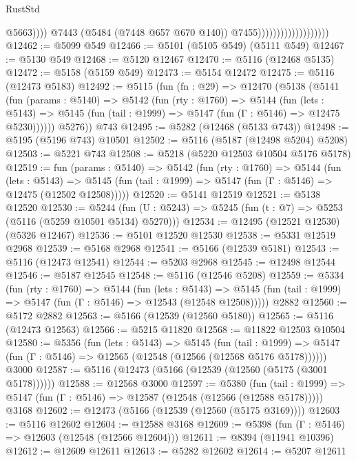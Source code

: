 \begin{lexlean}{RustStd}
\begin{coremodule}
{\begin{coremodule}
{{{{{{{{{{{{{{{{{{{{{{{{{{{{{{{                                                  @5663))))
                                          @7443
                                          (@5484 (@7448 @657 @670 @140))
                                          @7455)))))))))))))))))))
@12462 := @5099 @549
@12466 := @5101 (@5105 @549) (@5111 @549)
@12467 := @5130 @549
@12468 := @5120 @12467
@12470 := @5116 (@12468 @5135)
@12472 := @5158 (@5159 @549)
@12473 := @5154 @12472
@12475 := @5116 (@12473 @5183)
@12492 := @5115
    (fun (fn : @29) =>
    @12470
      (@5138
        (@5141
          (fun (params : @5140) =>
          @5142
            (fun (rty : @1760) =>
            @5144
              (fun (lets : @5143) =>
              @5145 (fun (tail : @1999) => @5147 (fun (Γ : @5146) => @12475 @5230))))))
        @5276))
    @743
@12495 := @5282 (@12468 (@5133 @743))
@12498 := @5195 (@5196 @743) @10501
@12502 := @5116 (@5187 (@12498 @5204) @5208)
@12503 := @5221 @743
@12508 := @5218 (@5220 @12503 @10504 @5176 @5178)
@12519 := fun (params : @5140) =>
  @5142
    (fun (rty : @1760) =>
    @5144
      (fun (lets : @5143) =>
      @5145 (fun (tail : @1999) => @5147 (fun (Γ : @5146) => @12475 (@12502 @12508)))))
@12520 := @5141 @12519
@12521 := @5138 @12520
@12530 := @5244
    (fun (U : @5243) => @5245 (fun (t : @7) => @5253 (@5116 (@5259 @10501 @5134) @5270)))
@12534 := @12495 (@12521 @12530) (@5326 @12467)
@12536 := @5101 @12520 @12530
@12538 := @5331 @12519 @2968
@12539 := @5168 @2968
@12541 := @5166 (@12539 @5181)
@12543 := @5116 (@12473 @12541)
@12544 := @5203 @2968
@12545 := @12498 @12544
@12546 := @5187 @12545
@12548 := @5116 (@12546 @5208)
@12559 := @5334
    (fun (rty : @1760) =>
    @5144
      (fun (lets : @5143) =>
      @5145 (fun (tail : @1999) => @5147 (fun (Γ : @5146) => @12543 (@12548 @12508)))))
    @2882
@12560 := @5172 @2882
@12563 := @5166 (@12539 (@12560 @5180))
@12565 := @5116 (@12473 @12563)
@12566 := @5215 @11820
@12568 := @11822 @12503 @10504
@12580 := @5356
    (fun (lets : @5143) =>
    @5145
      (fun (tail : @1999) =>
      @5147 (fun (Γ : @5146) => @12565 (@12548 (@12566 (@12568 @5176 @5178))))))
    @3000
@12587 := @5116 (@12473 (@5166 (@12539 (@12560 (@5175 (@3001 @5178))))))
@12588 := @12568 @3000
@12597 := @5380
    (fun (tail : @1999) => @5147 (fun (Γ : @5146) => @12587 (@12548 (@12566 (@12588 @5178)))))
    @3168
@12602 := @12473 (@5166 (@12539 (@12560 (@5175 @3169))))
@12603 := @5116 @12602
@12604 := @12588 @3168
@12609 := @5398 (fun (Γ : @5146) => @12603 (@12548 (@12566 @12604)))
@12611 := @8394 (@11941 @10396)
@12612 := @12609 @12611
@12613 := @5282 @12602
@12614 := @5207 @12611
}}}}}}}}}}}}}}}}}}}}}}}}}}}}}}}
\end{coremodule}}
\end{coremodule}
\end{lexlean}
